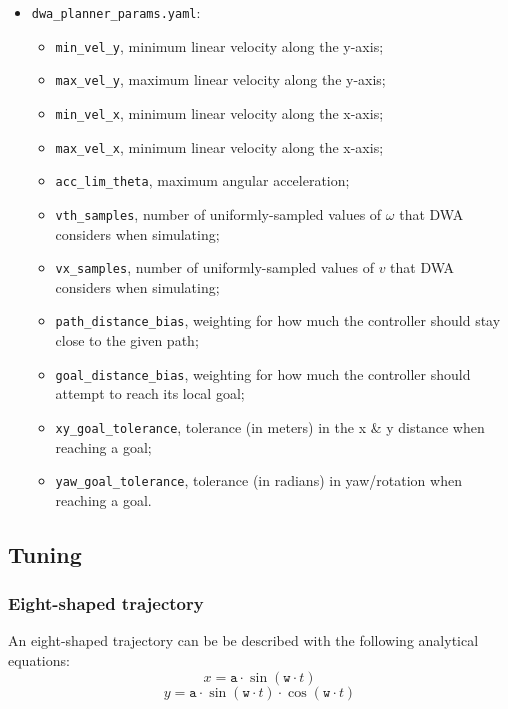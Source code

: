 \documentclass[11pt,a4paper]{article}
\begin{document}
\begin{itemize}
    \item \texttt{dwa\_planner\_params.yaml}:
        \begin{itemize}
            \item \texttt{min\_vel\_y}, minimum linear velocity along the y-axis;
            \item \texttt{max\_vel\_y}, maximum linear velocity along the y-axis;
            \item \texttt{min\_vel\_x}, minimum linear velocity along the x-axis;
            \item \texttt{max\_vel\_x}, minimum linear velocity along the x-axis;
            \item \texttt{acc\_lim\_theta}, maximum angular acceleration;
            \item \texttt{vth\_samples}, number of uniformly-sampled values of $\omega$ that DWA considers when simulating;
            \item \texttt{vx\_samples}, number of uniformly-sampled values of $v$ that DWA considers when simulating;
            \item \texttt{path\_distance\_bias}, weighting for how much the controller should stay close to the given path;
            \item \texttt{goal\_distance\_bias}, weighting for how much the controller should attempt to reach its local goal;
            \item \texttt{xy\_goal\_tolerance}, tolerance (in meters) in the x \& y distance when reaching a goal;
            \item \texttt{yaw\_goal\_tolerance}, tolerance (in radians) in yaw/rotation when reaching a goal.\\
        \end{itemize}

\end{itemize}



\subsection{Tuning}

\subsubsection{Eight-shaped trajectory}

An eight-shaped trajectory can be be described with the following analytical equations:
$$x = \texttt{a} \cdot \sin (\texttt{w} \cdot t)$$
$$y = \texttt{a} \cdot \sin (\texttt{w} \cdot t)\cdot \cos (\texttt{w} \cdot t)$$\\
\end{document}

